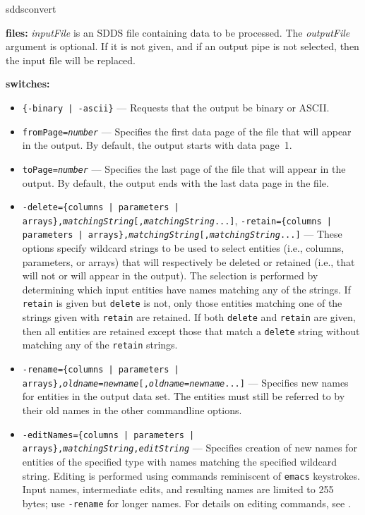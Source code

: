 \begin{sddsprog}{sddsconvert}
  \item \textbf{files:}
  \emph{inputFile} is an SDDS file containing data to be processed. The \emph{outputFile} argument is optional. If it is not given, and if an output pipe is not selected, then the input file will be replaced.

  \item \textbf{switches:}
    \begin{itemize}
    \item {\tt \{-binary | -ascii\}} --- Requests that the output be binary or ASCII.
    \item {\tt fromPage=\emph{number}} --- Specifies the first data page of the file that will appear in the output. By default, the output starts with data page~1.
    \item {\tt toPage=\emph{number}} --- Specifies the last page of the file that will appear in the output. By default, the output ends with the last data page in the file.
    \item {\tt -delete=\{columns | parameters | arrays\},\emph{matchingString}[,\emph{matchingString}...]}, {\tt -retain=\{columns | parameters | arrays\},\emph{matchingString}[,\emph{matchingString}...]} --- These options specify wildcard strings to be used to select entities (i.e., columns, parameters, or arrays) that will respectively be deleted or retained (i.e., that will not or will appear in the output). The selection is performed by determining which input entities have names matching any of the strings. If \verb|retain| is given but \verb|delete| is not, only those entities matching one of the strings given with \verb|retain| are retained. If both \verb|delete| and \verb|retain| are given, then all entities are retained except those that match a \verb|delete| string without matching any of the \verb|retain| strings.
    \item {\tt -rename=\{columns | parameters | arrays\},\emph{oldname}=\emph{newname}[,\emph{oldname}=\emph{newname}...]} --- Specifies new names for entities in the output data set. The entities must still be referred to by their old names in the other commandline options.
    \item {\tt -editNames=\{columns | parameters | arrays\},\emph{matchingString},\emph{editString}} --- Specifies creation of new names for entities of the specified type with names matching the specified wildcard string. Editing is performed using commands reminiscent of \verb|emacs| keystrokes. Input names, intermediate edits, and resulting names are limited to 255 bytes; use \verb|-rename| for longer names. For details on editing commands, see .

\end{itemize}
\end{sddsprog}
